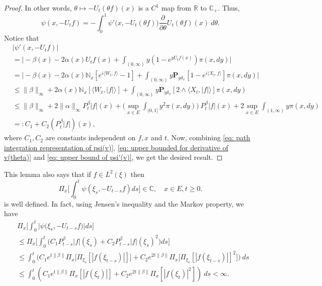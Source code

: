 \begin{proof}
    In other words, $\theta \mapsto -U_t(\theta f)(x)$ is a $C^1$ map from $\mathbb R$ to $\mathbb C_+$.
    Thus,
\begin{equation}
\label{eq: path integration representation of psi(v)}
    \psi(x,-U_tf)
    = -\int_0^1 \psi'\big(x,-U_t(\theta f)\big) \frac{\partial}{\partial \theta} U_t(\theta f)(x)~d\theta.
\end{equation}
    Notice that
\begin{align}
\label{eq: upper bound of psi'(v)}
    &|\psi'(x, -U_tf)|
    \\&= \Big| -\beta(x)- 2\alpha(x) U_tf(x)+ \int_{(0,\infty)} y (1- e^{y U_tf(x)} ) \pi(x,dy)\Big|
    \\&= \Big| - \beta(x)- 2\alpha(x)\mathbb N_x[e^{i \langle W_t, f\rangle} - 1]  + \int_{(0,\infty)} y \mathbf P_{y \delta_x}[1-e^{i \langle X_t, f\rangle}] \pi(x,dy) \Big|
    \\ &\leq \|\beta\|_\infty + 2\alpha(x)\mathbb N_x[\langle W_t, |f|\rangle]+ \int_{(0,\infty)} y\mathbf P_{y\delta_x}[2\wedge \langle X_t, |f|\rangle] \pi(x,dy)
    \\ &\leq \|\beta\|_\infty + 2\|\alpha\|_\infty
    P^{\beta}_t |f|(x) + \Big(\sup_{x\in E}\int_{(0,1]}y^2 \pi(x,dy)\Big)~P^{\beta}_t |f|(x) + 2\sup_{x\in E}\int_{(1,\infty)} y \pi(x,dy)
    \\ &=: C_1 + C_2(P^{\beta}_t |f|)(x),
\end{align}
    where $C_1, C_2$ are constants independent on $f,x$ and $t$.
    Now, combining \eqref{eq: path integration representation of psi(v)}, \eqref{eq: upper bounded for derivative of v(theta)} and \eqref{eq: upper bound of psi'(v)}, we get the desired result.
\end{proof}

    This lemma also says that if $f\in L^2(\xi)$ then
\[
    \Pi_x\Big[\int_0^t \psi(\xi_s,- U_{t-s}f)ds\Big]
    \in \mathbb C,
    \quad x\in E, t\geq 0.
\]
    is well defined.
    In fact, using Jensen's inequality and the Markov property, we have
\begin{align}
\label{eq: domination of psi(v)}
    &\Pi_x\Big[\int_0^t \big|\psi \big(\xi_s,-U_{t-s}f\big)\big|ds\Big]
    \\&\leq \Pi_x\Big[\int_0^t \big(C_1 P_{t-s}^{\beta}|f|(\xi_s)+C_2 P_{t-s}^{\beta}|f|(\xi_s)^2\big)ds\Big]
    \\ &\leq \int_0^t \big(C_1 e^{t\|\beta\|}\Pi_x \big[ \Pi_{\xi_s}[|f(\xi_{t-s})|] \big]+C_2 e^{2t\|\beta\|}\Pi_x \big[ \Pi_{\xi_s}[|f (\xi_{t-s})|]^2 \big]\big)~ds
    \\ &\leq \int_0^t (C_1 e^{t\|\beta\|}\Pi_x [ |f(\xi_{t})|]+C_2e^{2t\|\beta\|}\Pi_x [ |f (\xi_{t})|^2 ])~ds < \infty.
\end{align}

